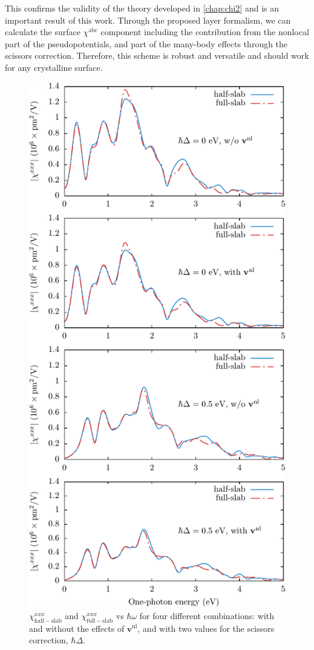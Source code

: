 This confirms the validity of the theory developed in \ref{chap:chi2} and is an
important result of this work. Through the proposed layer formalism, we can
calculate the surface $\chi^{\mathrm{abc}}$ component including the contribution
from the nonlocal part of the pseudopotentials, and part of the many-body
effects through the scissors correction. Therefore, this scheme is robust and
versatile and should work for any crystalline surface.

\begin{figure}[H]
\centering 
\includegraphics[height=0.9\textheight]{content/figures/fig-Si2x1-hsvsfs}
\caption{$\chi^{xxx}_{\mathrm{half-slab}}$ and $\chi^{xxx}_{\mathrm{full-slab}}$
vs $\hbar\omega$ for four different combinations: with and without the effects
of $\mathbf{v}^\mathrm{nl}$, and with two values for the scissors correction,
$\hbar\Delta$.}
\label{fig:hsvfs}
\end{figure}


